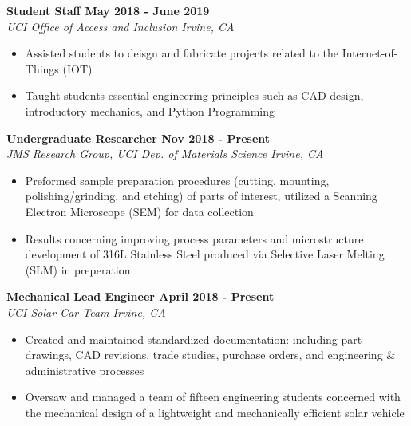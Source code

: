 \documentclass[10pt]{article}
\begin{document}
\vspace{0.08in}

\noindent\textbf{Student Staff \hfill May 2018 - June 2019}\\
\textit{UCI Office of Access and Inclusion  \hfill Irvine, CA}
\begin{itemize}
    \item Assisted students to deisgn and fabricate projects related to the Internet-of-Things (IOT)
    \item Taught students essential engineering principles such as CAD design, introductory mechanics, and Python Programming
\end{itemize}

\vspace{0.08in}

\myrule

\noindent\textbf{Undergraduate Researcher \hfill Nov 2018 - Present}\\
\textit{JMS Research Group, UCI Dep. of Materials Science \hfill Irvine, CA}
\begin{itemize}
    \item Preformed sample preparation procedures (cutting, mounting, polishing/grinding, and etching) of parts of interest, utilized a Scanning Electron Microscope (SEM) for data collection
    \item Results concerning improving process parameters and microstructure development of 316L Stainless Steel produced via Selective Laser Melting (SLM) in preperation

\end{itemize}

\vspace{0.15in}

\noindent\textbf{Mechanical Lead Engineer \hfill April 2018 - Present}\\
\textit{UCI Solar Car Team \hfill Irvine, CA}
\begin{itemize}
    \item Created and maintained standardized documentation: including part drawings, CAD revisions, trade studies, purchase orders, and engineering \& administrative processes
    \item Oversaw and managed a team of fifteen engineering students concerned with the mechanical design of a lightweight and mechanically efficient solar vehicle
\end{itemize}

\vspace{0.15in}
\end{document}
